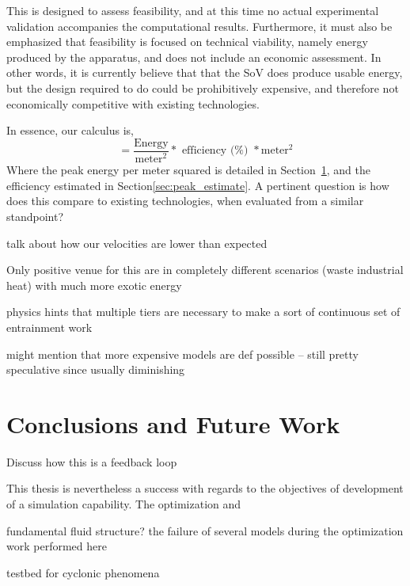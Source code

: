 This is designed to assess feasibility, and at this time no 
actual experimental validation accompanies the computational
results. Furthermore, it must also be emphasized that feasibility is
focused on technical viability, namely energy produced by the apparatus,
and does not include an economic assessment. In other words, it is
currently believe that that the SoV does produce usable energy, 
but the design required to do could be prohibitively expensive, and
therefore not economically competitive with existing technologies. 


In essence, our calculus is, 
\begin{equation}
 = \frac{\text{Energy}}{\text{meter}^2} * \text{ efficiency (\%) } *
  \text{meter}^2 
\end{equation}
Where the peak energy per meter squared is detailed in Section~\ref{},
and the efficiency estimated in Section\ref{sec:peak_estimate}. A
pertinent question is how does this compare to existing technologies,
when evaluated from a similar standpoint?

talk about how our velocities are lower than expected

Only positive venue for this are in 
completely different scenarios (waste industrial heat)
with much more exotic energy

physics hints that multiple tiers are necessary to make a sort of
continuous set of entrainment work

might mention that more expensive models are def possible -- still pretty speculative since usually diminishing

\section{Conclusions and Future Work}

Discuss how this is a feedback loop

This thesis is nevertheless a success with regards to the objectives of
development of a simulation capability. The optimization and 

fundamental fluid structure? the failure of several models during the
optimization work performed here 

testbed for cyclonic phenomena


